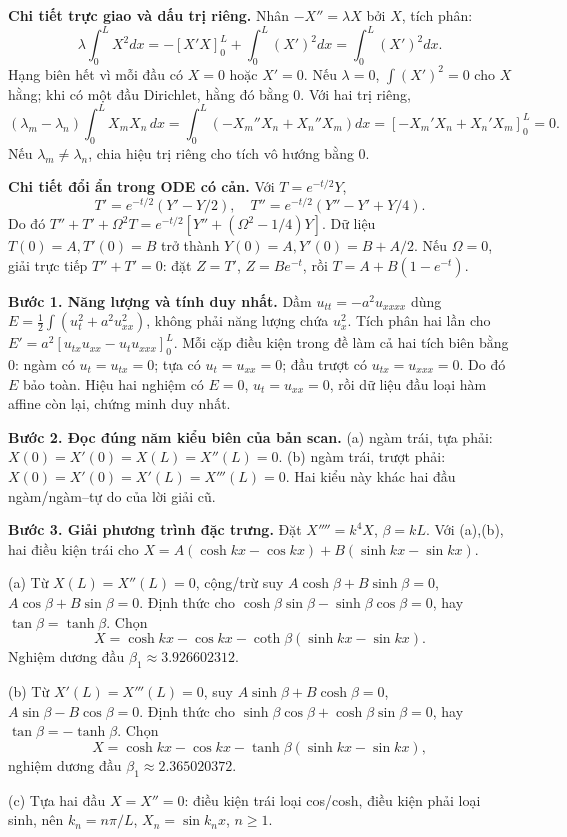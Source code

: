 \textbf{Chi tiết trực giao và dấu trị riêng.} Nhân $-X''=\lambda X$ bởi $X$, tích phân:
\[\lambda\int_0^LX^2dx=-[X'X]_0^L+\int_0^L(X')^2dx=\int_0^L(X')^2dx.\]
Hạng biên hết vì mỗi đầu có $X=0$ hoặc $X'=0$. Nếu $\lambda=0$, $\int(X')^2=0$ cho $X$ hằng; khi có một đầu Dirichlet, hằng đó bằng $0$. Với hai trị riêng,
\[(\lambda_m-\lambda_n)\int_0^LX_mX_n\,dx
=\int_0^L(-X_m''X_n+X_n''X_m)dx
=[-X_m'X_n+X_n'X_m]_0^L=0.\]
Nếu $\lambda_m\ne\lambda_n$, chia hiệu trị riêng cho tích vô hướng bằng $0$.

\textbf{Chi tiết đổi ẩn trong ODE có cản.} Với $T=e^{-t/2}Y$,
\[T'=e^{-t/2}(Y'-Y/2),\quad T''=e^{-t/2}(Y''-Y'+Y/4).\]
Do đó $T''+T'+\Omega^2T=e^{-t/2}[Y''+(\Omega^2-1/4)Y]$. Dữ liệu $T(0)=A,T'(0)=B$ trở thành $Y(0)=A,Y'(0)=B+A/2$. Nếu $\Omega=0$, giải trực tiếp $T''+T'=0$: đặt $Z=T'$, $Z=Be^{-t}$, rồi $T=A+B(1-e^{-t})$.

\textbf{Bước 1. Năng lượng và tính duy nhất.} Dầm $u_{tt}=-a^2u_{xxxx}$ dùng $E=\frac12\int(u_t^2+a^2u_{xx}^2)$, không phải năng lượng chứa $u_x^2$. Tích phân hai lần cho $E'=a^2[u_{tx}u_{xx}-u_tu_{xxx}]_0^L$. Mỗi cặp điều kiện trong đề làm cả hai tích biên bằng $0$: ngàm có $u_t=u_{tx}=0$; tựa có $u_t=u_{xx}=0$; đầu trượt có $u_{tx}=u_{xxx}=0$. Do đó $E$ bảo toàn. Hiệu hai nghiệm có $E=0$, $u_t=u_{xx}=0$, rồi dữ liệu đầu loại hàm affine còn lại, chứng minh duy nhất.

\textbf{Bước 2. Đọc đúng năm kiểu biên của bản scan.} (a) ngàm trái, tựa phải: $X(0)=X'(0)=X(L)=X''(L)=0$. (b) ngàm trái, trượt phải: $X(0)=X'(0)=X'(L)=X'''(L)=0$. Hai kiểu này khác hai đầu ngàm/ngàm–tự do của lời giải cũ.

\textbf{Bước 3. Giải phương trình đặc trưng.} Đặt $X''''=k^4X$, $\beta=kL$. Với (a),(b), hai điều kiện trái cho $X=A(\cosh kx-\cos kx)+B(\sinh kx-\sin kx)$.

(a) Từ $X(L)=X''(L)=0$, cộng/trừ suy $A\cosh\beta+B\sinh\beta=0$, $A\cos\beta+B\sin\beta=0$. Định thức cho $\cosh\beta\sin\beta-\sinh\beta\cos\beta=0$, hay $\tan\beta=\tanh\beta$. Chọn
\[X=\cosh kx-\cos kx-\coth\beta(\sinh kx-\sin kx).\]
Nghiệm dương đầu $\beta_1\approx3.926602312$.

(b) Từ $X'(L)=X'''(L)=0$, suy $A\sinh\beta+B\cosh\beta=0$, $A\sin\beta-B\cos\beta=0$. Định thức cho $\sinh\beta\cos\beta+\cosh\beta\sin\beta=0$, hay $\tan\beta=-\tanh\beta$. Chọn
\[X=\cosh kx-\cos kx-\tanh\beta(\sinh kx-\sin kx),\]
nghiệm dương đầu $\beta_1\approx2.365020372$.

(c) Tựa hai đầu $X=X''=0$: điều kiện trái loại cos/cosh, điều kiện phải loại sinh, nên $k_n=n\pi/L$, $X_n=\sin k_nx$, $n\ge1$.

